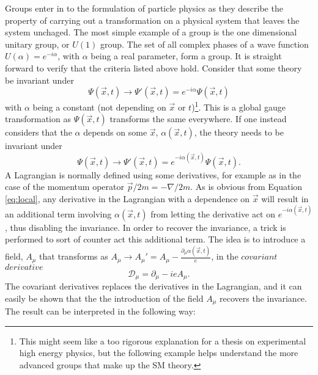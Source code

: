 Groups enter in to the formulation of particle physics as they describe the property of carrying out a transformation on a physical system that leaves the system unchaged. 
The most simple example of a group is the one dimensional unitary group, or $U(1)$ group. 
The set of all complex phases of a wave function $U(\alpha)=e^{-i\alpha}$, with $\alpha$ being a real parameter, form a group.
It is straight forward to verify that the criteria listed above hold. 
Consider that some theory be invariant under 
\begin{equation}
\Psi(\vec{x},t)\rightarrow \Psi'(\vec{x},t)=e^{-i\alpha}\Psi(\vec{x},t)
\end{equation}                                                         
with $\alpha$ being a constant (not depending on $\vec{x}$ or $t$)\footnote{This might seem like a too rigorous explanation for a thesis on experimental high energy physics, but the following example helps understand the more advanced groups that make up the SM theory.}. 
This is a global gauge transformation as $\Psi(\vec{x},t)$ transforms the same everywhere.  
If one instead considers that the $\alpha$ depends on some $\vec{x}$, $\alpha(\vec{x},t)$, the theory needs to be invariant under 
\begin{equation}
\Psi(\vec{x},t)\rightarrow \Psi'(\vec{x},t)=e^{-i\alpha(\vec{x},t)}\Psi(\vec{x},t). 
\label{eq:local}
\end{equation}                                                         
A Lagrangian is normally defined using some derivatives, for example as in the case of the momentum operator $\vec{p}/2m=-\nabla/2m$. 
As is obvious from Equation \ref{eq:local}, any derivative in the Lagrangian with a dependence on $\vec{x}$ will result in an additional term involving $\alpha(\vec{x},t)$ from letting the derivative act on $e^{-i\alpha(\vec{x},t)}$, thus disabling the invariance.
In order to recover the invariance, a trick is performed to sort of counter act this additional term. 
The idea is to introduce a field, $A_{\mu}$ that transforms as $A_{\mu}\rightarrow A_{\mu}'=A_{\mu}-\frac{\partial_{\mu}\alpha(\vec{x},t)}{e}$, in the $covariant$ $derivative$
\begin{equation}
\mathcal{D}_{\mu}=\partial_{\mu}-ieA_{\mu}.
\end{equation}                                                         
The covariant derivatives replaces the derivatives in the Lagrangian, and it can easily be shown that the the introduction of the field $A_{\mu}$ recovers the invariance. 
The result can be interpreted in the following way: 
